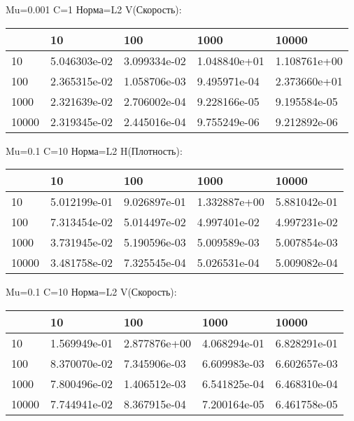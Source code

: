 \documentclass[a4paper, 12pt]{article}
\begin{document}
\bigskip
\bigskip
\bigskip


Mu=0.001  C=1 Норма=L2 V(Скорость):


\begin{tabular}{lllll}
\toprule
{} &         10    &         100   &         1000  &         10000 \\
\midrule
10    &  5.046303e-02 &  3.099334e-02 &  1.048840e+01 &  1.108761e+00 \\
100   &  2.365315e-02 &  1.058706e-03 &  9.495971e-04 &  2.373660e+01 \\
1000  &  2.321639e-02 &  2.706002e-04 &  9.228166e-05 &  9.195584e-05 \\
10000 &  2.319345e-02 &  2.445016e-04 &  9.755249e-06 &  9.212892e-06 \\
\bottomrule
\end{tabular}



\bigskip
\bigskip
\bigskip


Mu=0.1  C=10 Норма=L2 H(Плотность):


\begin{tabular}{lllll}
\toprule
{} &         10    &         100   &         1000  &         10000 \\
\midrule
10    &  5.012199e-01 &  9.026897e-01 &  1.332887e+00 &  5.881042e-01 \\
100   &  7.313454e-02 &  5.014497e-02 &  4.997401e-02 &  4.997231e-02 \\
1000  &  3.731945e-02 &  5.190596e-03 &  5.009589e-03 &  5.007854e-03 \\
10000 &  3.481758e-02 &  7.325545e-04 &  5.026531e-04 &  5.009082e-04 \\
\bottomrule
\end{tabular}



\bigskip
\bigskip
\bigskip


Mu=0.1  C=10 Норма=L2 V(Скорость):


\begin{tabular}{lllll}
\toprule
{} &         10    &         100   &         1000  &         10000 \\
\midrule
10    &  1.569949e-01 &  2.877876e+00 &  4.068294e-01 &  6.828291e-01 \\
100   &  8.370070e-02 &  7.345906e-03 &  6.609983e-03 &  6.602657e-03 \\
1000  &  7.800496e-02 &  1.406512e-03 &  6.541825e-04 &  6.468310e-04 \\
10000 &  7.744941e-02 &  8.367915e-04 &  7.200164e-05 &  6.461758e-05 \\
\bottomrule
\end{tabular}
\end{document}

